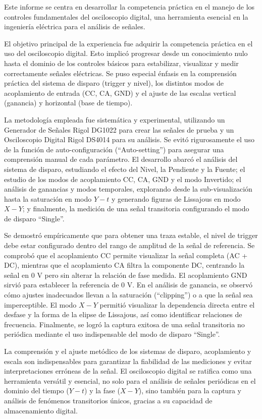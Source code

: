 Este informe se centra en desarrollar la competencia práctica en el manejo de los controles fundamentales del osciloscopio digital, una herramienta esencial en la ingeniería eléctrica para el análisis de señales.

El objetivo principal de la experiencia fue adquirir la competencia práctica en el uso del osciloscopio digital. Esto implicó progresar desde un conocimiento nulo hasta el dominio de los controles básicos para estabilizar, visualizar y medir correctamente señales eléctricas. Se puso especial énfasis en la comprensión práctica del sistema de disparo (trigger y nivel), los distintos modos de acoplamiento de entrada (CC, CA, GND) y el ajuste de las escalas vertical (ganancia) y horizontal (base de tiempo).

La metodología empleada fue sistemática y experimental, utilizando un Generador de Señales Rigol DG1022 para crear las señales de prueba y un Osciloscopio Digital Rigol DS4014 para su análisis. Se evitó rigurosamente el uso de la función de auto-configuración (``Auto-setting'') para asegurar una comprensión manual de cada parámetro. El desarrollo abarcó el análisis del sistema de disparo, estudiando el efecto del Nivel, la Pendiente y la Fuente; el estudio de los modos de acoplamiento CC, CA, GND y el modo Invertido; el análisis de ganancias y modos temporales, explorando desde la sub-visualización hasta la saturación en modo $Y-t$ y generando figuras de Lissajous en modo $X-Y$; y finalmente, la medición de una señal transitoria configurando el modo de disparo ``Single''.

Se demostró empíricamente que para obtener una traza estable, el nivel de trigger debe estar configurado dentro del rango de amplitud de la señal de referencia. Se comprobó que el acoplamiento CC permite visualizar la señal completa (AC + DC), mientras que el acoplamiento CA filtra la componente DC, centrando la señal en $0 \text{ V}$ pero sin alterar la relación de fase medida. El acoplamiento GND sirvió para establecer la referencia de $0 \text{ V}$. En el análisis de ganancia, se observó cómo ajustes inadecuados llevan a la saturación (``clipping'') o a que la señal sea imperceptible. El modo $X-Y$ permitió visualizar la dependencia directa entre el desfase y la forma de la elipse de Lissajous, así como identificar relaciones de frecuencia. Finalmente, se logró la captura exitosa de una señal transitoria no periódica mediante el uso indispensable del modo de disparo ``Single''.

La comprensión y el ajuste metódico de los sistemas de disparo, acoplamiento y escala son indispensables para garantizar la fiabilidad de las mediciones y evitar interpretaciones erróneas de la señal. El osciloscopio digital se ratifica como una herramienta versátil y esencial, no solo para el análisis de señales periódicas en el dominio del tiempo ($Y-t$) y la fase ($X-Y$), sino también para la captura y análisis de fenómenos transitorios únicos, gracias a su capacidad de almacenamiento digital.